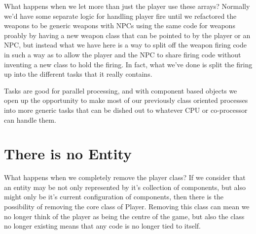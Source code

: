 What happens when we let more than just the player use these arrays? Normally
we'd have some separate logic for handling player fire until we refactored the
weapons to be generic weapons with NPCs using the same code for weapons proably
by having a new weapon class that can be pointed to by the player or an NPC,
but instead what we have here is a way to split off the weapon firing code in
such a way as to allow the player and the NPC to share firing code without
inventing a new class to hold the firing. In fact, what we've done is split the
firing up into the different tasks that it really contains.

Tasks are good for parallel processing, and with component based objects we
open up the opportunity to make most of our previously class oriented processes
into more generic tasks that can be dished out to whatever CPU or co-processor
can handle them.

\section{There is no Entity}

What happens when we completely remove the player class? If we consider that an
entity may be not only represented by it's collection of components, but also
might only be it's current configuration of components, then there is the
possibility of removing the core class of Player.  Removing this class can mean
we no longer think of the player as being the centre of the game, but also the
class no longer existing means that any code is no longer tied to itself.

